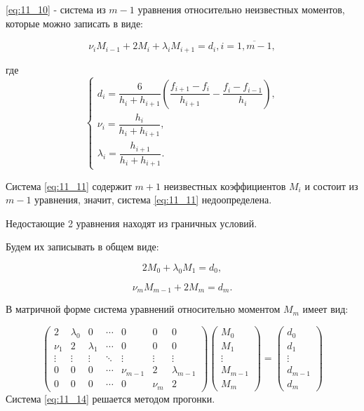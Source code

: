 \eqref{eq:11_10} - система из $m - 1$ уравнения относительно неизвестных моментов, которые можно записать в виде:

\begin{equation}\label{eq:11_11}
  \nu_i M_{i - 1} + 2 M_i + \lambda_i M_{i + 1} = d_i, i = \overline{1, m - 1},
\end{equation}

где
\begin{equation*}
  \begin{cases}
    d_i = \dfrac{6}{h_i + h_{i + 1}} \left( \dfrac{f_{i + 1} - f_i}{h_{i + 1}} - \dfrac{f_{i} - f_{i - 1}}{h_{i}} \right), \\
    \nu_i = \dfrac{h_i}{h_i + h_{i + 1}}, \\
    \lambda_i = \dfrac{h_{i + 1}}{h_i + h_{i + 1}}.
  \end{cases}
\end{equation*}

Система \eqref{eq:11_11} содержит $m+1$ неизвестных коэффициентов $M_i$ и состоит из $m-1$ уравнения, значит, система \eqref{eq:11_11} недоопределена.

Недостающие 2 уравнения находят из граничных условий.

Будем их записывать в общем виде:

\begin{equation*}
  2 M_0 + \lambda_0 M_1 = d_0,
\end{equation*}

\begin{equation*}
  \nu_m M_{m - 1} + 2 M_m = d_m.
\end{equation*}

В матричной форме система уравнений относительно моментом $M_m$ имеет вид:

\begin{equation}\label{eq:11_14}
\begin{pmatrix}
  2 & \lambda_0 & 0 & \cdots & 0 & 0 & 0\\
  \nu_1 & 2 & \lambda_1 & \cdots & 0 & 0 & 0 \\
  \vdots  & \vdots & \vdots & \ddots & \vdots & \vdots & \vdots \\
  0 & 0 & 0 & \cdots & \nu_{m - 1} & 2 & \lambda_{m - 1} \\
  0 & 0 & 0 & \cdots & 0 & \nu_m & 2 
 \end{pmatrix} \begin{pmatrix}
  M_0 \\
  M_1 \\
  \vdots \\
  M_{m-1} \\
  M_m
 \end{pmatrix}
 = 
 \begin{pmatrix}
  d_0 \\
  d_1 \\
  \vdots \\
  d_{m-1} \\
  d_m
 \end{pmatrix}
 \end{equation}
Система \eqref{eq:11_14} решается методом прогонки.

